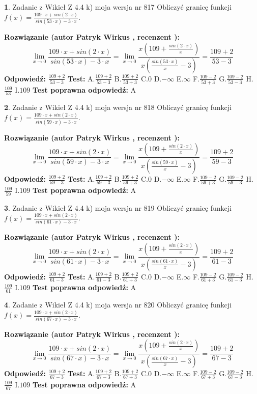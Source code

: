 \documentclass[12pt, a4paper]{article}
\theoremstyle{definition} %
\newtheorem{zad}{}
\newcommand{\zadStart}[1]{\begin{zad}#1\newline}
\newcommand{\zadStop}{\end{zad}}
\newcommand{\rozwStart}[2]{\noindent \textbf{Rozwiązanie (autor #1 , recenzent #2): }\newline}
\newcommand{\rozwStop}{\newline}
\newcommand{\odpStart}{\noindent \textbf{Odpowiedź:}\newline}
\newcommand{\odpStop}{\newline}
\newcommand{\testStart}{\noindent \textbf{Test:}\newline}
\newcommand{\testStop}{\newline}
\newcommand{\kluczStart}{\noindent \textbf{Test poprawna odpowiedź:}\newline}
\newcommand{\kluczStop}{\newline}
\begin{document}
\zadStart{Zadanie z Wikieł Z 4.4 k) moja wersja nr 817}
Obliczyć granicę funkcji $f(x)=\frac{109\cdot x +sin(2\cdot x)}{sin(53\cdot x) -3\cdot x}$.
\zadStop
\rozwStart{Patryk Wirkus}{}
$$\lim\limits_{x\to 0}\frac{109\cdot x +sin(2\cdot x)}{sin(53\cdot x) -3\cdot x}
=\lim\limits_{x\to 0}\frac{x(109+\frac{sin(2\cdot x)}{x})}{x(\frac{sin(53\cdot x)}{x}-3)}
=\frac{109+2}{53-3}$$
\rozwStop
\odpStart
$\frac{109+2}{53-3}$
\odpStop
\testStart
A.$\frac{109+2}{53-3}$
B.$\frac{109+2}{53+3}$
C.$0$
D.$-\infty$
E.$\infty$
F.$\frac{109-2}{53+3}$
G.$\frac{109-2}{53-3}$
H.$\frac{109}{53}$
I.$109$
\testStop
\kluczStart
A
\kluczStop



\zadStart{Zadanie z Wikieł Z 4.4 k) moja wersja nr 818}
Obliczyć granicę funkcji $f(x)=\frac{109\cdot x +sin(2\cdot x)}{sin(59\cdot x) -3\cdot x}$.
\zadStop
\rozwStart{Patryk Wirkus}{}
$$\lim\limits_{x\to 0}\frac{109\cdot x +sin(2\cdot x)}{sin(59\cdot x) -3\cdot x}
=\lim\limits_{x\to 0}\frac{x(109+\frac{sin(2\cdot x)}{x})}{x(\frac{sin(59\cdot x)}{x}-3)}
=\frac{109+2}{59-3}$$
\rozwStop
\odpStart
$\frac{109+2}{59-3}$
\odpStop
\testStart
A.$\frac{109+2}{59-3}$
B.$\frac{109+2}{59+3}$
C.$0$
D.$-\infty$
E.$\infty$
F.$\frac{109-2}{59+3}$
G.$\frac{109-2}{59-3}$
H.$\frac{109}{59}$
I.$109$
\testStop
\kluczStart
A
\kluczStop



\zadStart{Zadanie z Wikieł Z 4.4 k) moja wersja nr 819}
Obliczyć granicę funkcji $f(x)=\frac{109\cdot x +sin(2\cdot x)}{sin(61\cdot x) -3\cdot x}$.
\zadStop
\rozwStart{Patryk Wirkus}{}
$$\lim\limits_{x\to 0}\frac{109\cdot x +sin(2\cdot x)}{sin(61\cdot x) -3\cdot x}
=\lim\limits_{x\to 0}\frac{x(109+\frac{sin(2\cdot x)}{x})}{x(\frac{sin(61\cdot x)}{x}-3)}
=\frac{109+2}{61-3}$$
\rozwStop
\odpStart
$\frac{109+2}{61-3}$
\odpStop
\testStart
A.$\frac{109+2}{61-3}$
B.$\frac{109+2}{61+3}$
C.$0$
D.$-\infty$
E.$\infty$
F.$\frac{109-2}{61+3}$
G.$\frac{109-2}{61-3}$
H.$\frac{109}{61}$
I.$109$
\testStop
\kluczStart
A
\kluczStop



\zadStart{Zadanie z Wikieł Z 4.4 k) moja wersja nr 820}
Obliczyć granicę funkcji $f(x)=\frac{109\cdot x +sin(2\cdot x)}{sin(67\cdot x) -3\cdot x}$.
\zadStop
\rozwStart{Patryk Wirkus}{}
$$\lim\limits_{x\to 0}\frac{109\cdot x +sin(2\cdot x)}{sin(67\cdot x) -3\cdot x}
=\lim\limits_{x\to 0}\frac{x(109+\frac{sin(2\cdot x)}{x})}{x(\frac{sin(67\cdot x)}{x}-3)}
=\frac{109+2}{67-3}$$
\rozwStop
\odpStart
$\frac{109+2}{67-3}$
\odpStop
\testStart
A.$\frac{109+2}{67-3}$
B.$\frac{109+2}{67+3}$
C.$0$
D.$-\infty$
E.$\infty$
F.$\frac{109-2}{67+3}$
G.$\frac{109-2}{67-3}$
H.$\frac{109}{67}$
I.$109$
\testStop
\kluczStart
A
\kluczStop
\end{document}
